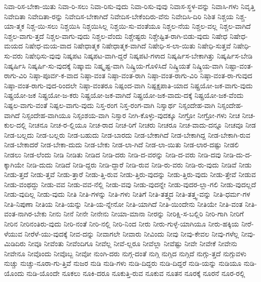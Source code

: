 {ನಿವಾ-ರಿಸ-ಬೇಕಾ-ಯಿತು
ನಿವಾ-ರಿ-ಸಲು
ನಿವಾ-ರಿಸು-ವುದು
ನಿವಾ-ರಿಸು-ವುವು
ನಿವಾಸ-ಸ್ಥಳ-ವನ್ನು
ನಿವಾಸಿ-ಗಳು
ನಿವೃತ್ತಿ
ನಿವೇದಿತಾ
ನಿವೇದಿತಾ-ರನ್ನು
ನಿವೇದಿಸ-ಬೇಕಾಗಿದೆ
ನಿವೇದಿಸ-ಬೇಕೆಂದಿರು-ವೆನು
ನಿವೇದಿಸಿ-ದಿರಿ
ನಿಶಿತ
ನಿಶ್ಚಯ
ನಿಶ್ಚ-ಯಾ-ತ್ಮಕ
ನಿಶ್ಚ-ಯಿ-ಸಲು
ನಿಶ್ಚಯಿಸಿ
ನಿಶ್ಚಯಿಸಿಲ್ಲ
ನಿಶ್ಚಯಿ-ಸು-ವಂತೆಯೂ
ನಿಶ್ಚಲ-ನೆಯ
ನಿಶ್ಚಲ-ವಲ್ಲ
ನಿಶ್ಚಲ-ವಾಗಿದೆ
ನಿಶ್ಚಲ-ವಾಗು-ತ್ತದೆ
ನಿಶ್ಚಲ-ವಾಗು-ವುದು
ನಿಶ್ಚಲ-ವೆಂದು
ನಿಶ್ಚೇಷ್ಟರು
ನಿಶ್ಚೇಷ್ಟಿತ-ರಾಗಿ-ಬಿಡು-ವುದು
ನಿಷೇಧ
ನಿಷೇಧ-ಮಯದ
ನಿಷೇಧ-ಮಯ-ವಾದ
ನಿಷೇಧಾತ್ಮಕ
ನಿಷೇಧಾತ್ಮಕ-ವಾಗಿದೆ
ನಿಷೇಧಿ-ಸ-ಲಾ-ಯಿತು
ನಿಷೇಧಿ-ಸುತ್ತವೆ
ನಿಷೇಧಿ-ಸು-ವರು
ನಿಷೇಧಿಸು-ವುವು
ನಿಷ್ಕಪಟ
ನಿಷ್ಕಪಟ-ವಾಗಿ-ದ್ದರೆ
ನಿಷ್ಕಪಟಿ-ಗಳಾದ
ನಿಷ್ಕರ್ಷಿಸ-ಬೇಕಾಗಿತ್ತು
ನಿಷ್ಕರ್ಷಿಸ-ಬೇಡಿ
ನಿಷ್ಕರ್ಷಿಸಿ
ನಿಷ್ಕರ್ಷಿ-ಸು-ವುದಕ್ಕೆ
ನಿಷ್ಕಾಮ
ನಿಷ್ಕೃಷ್ಟ-ವಾಗಿ
ನಿಷ್ಕ್ರಿಯ-ಗೊಳಿಸಿದೆ
ನಿಷ್ಕ್ರಿಯತೆ
ನಿಷ್ಕ್ರಿಯ-ವಾಗಿ
ನಿಷ್ಟಾ-ವಂತ-ರಾಗು-ವಿರಿ
ನಿಷ್ಠಾ-ಪೂರ್ವ-ಕ-ವಾದ
ನಿಷ್ಠಾ-ವಂತ
ನಿಷ್ಠಾ-ವಂತ-ರಾಗಿ
ನಿಷ್ಠಾ-ವಂತ-ರಾಗು-ವಿರಿ
ನಿಷ್ಠಾ-ವಂತ-ರಾ-ಗುವುದ
ನಿಷ್ಠಾ-ವಂತ-ರಾಗು-ವುದ-ರಿಂದಲೇ
ನಿಷ್ಠಾ-ವಂತರೂ
ನಿಷ್ಪಂದ-ವಾಗಿ
ನಿಷ್ಪಕ್ಷಪಾತಿ-ಯಾದ
ನಿಷ್ಪ್ರಯೋ-ಜಕ-ವಾಗು-ವುದು
ನಿಷ್ಪ್ರಯೋ-ಜಕ
ನಿಷ್ಪ್ರಯೋ-ಜ-ಕರು
ನಿಷ್ಪ್ರಯೋ-ಜಕ-ವಾಗಿದೆ
ನಿಷ್ಪ್ರಯೋ-ಜಕ-ವಾದು-ದಕ್ಕೆ
ನಿಷ್ಪ್ರಯೋ-ಜಕ-ವೆಂದು
ನಿಷ್ಫಲ-ವಾಗು-ವಂತೆ
ನಿಷ್ಫಲ-ವಾಗು-ವುದು
ನಿಸ್ತ-ರಂಗ
ನಿಸ್ತ-ರಂಗ-ವಾಗಿ
ನಿಸ್ವಾರ್ಥ
ನಿಸ್ಸಂದೇಹ-ವಾಗಿ
ನಿಸ್ಸಂದೇಹ-ವಾಗಿದೆ
ನಿಸ್ಸಂದೇಹ-ವಾಗಿಯೂ
ನಿಸ್ಸಂಶಯ-ವಾಗಿ
ನಿಸ್ಸಾರ
ನೀಗಿ-ಕೊಳ್ಳು-ವುದಕ್ಕೂ
ನೀಗ್ರೋ
ನೀಗ್ರೋ-ಗಳು
ನೀಚ
ನೀಚ-ಕುಲ-ದಲ್ಲಿ
ನೀಚನೂ
ನೀಚ-ರ-ಲ್ಲಿಯೂ
ನೀಚ-ರಾದ
ನೀಚ-ರಿಗೆ
ನೀಚರು
ನೀಚರೂ
ನೀಚ-ವಾದು-ದನ್ನೂ
ನೀಚವೂ
ನೀಡ
ನೀಡ-ಬಲ್ಲದು
ನೀಡ-ಬಲ್ಲರು
ನೀಡ-ಬಹುದು
ನೀಡ-ಬಾರದು
ನೀಡ-ಬೇಕಾಗಿದೆ
ನೀಡ-ಬೇಕಾಗಿದ್ದ
ನೀಡ-ಬೇಕಾಗಿ-ರುವ
ನೀಡ-ಬೇಕಾದರೆ
ನೀಡ-ಬೇಕಾ-ದುದು
ನೀಡ-ಬೇಕು
ನೀಡ-ಲಾ-ಗಿದೆ
ನೀಡ-ಲಾ-ಯಿತು
ನೀಡ-ಲಾರ-ದಷ್ಟು
ನೀಡಲಿ
ನೀಡಲು
ನೀಡ-ಲೆಂದು
ನೀಡಿ
ನೀಡಿತು
ನೀಡಿದ
ನೀಡಿ-ದರು
ನೀಡಿ-ದ-ವರನ್ನು
ನೀಡಿ-ದ-ವರು
ನೀಡಿ-ದವು
ನೀಡಿ-ದು-ದ-ಕ್ಕಾಗಿಯೇ
ನೀಡಿ-ದುದು
ನೀಡಿದೆ
ನೀಡಿ-ದ್ದರು
ನೀಡಿ-ದ್ದಾರೆ
ನೀಡಿ-ರುವ
ನೀಡಿ-ರು-ವರು
ನೀಡಿ-ರು-ವುದು
ನೀಡಿವೆ
ನೀಡು
ನೀಡು-ತ್ತದೆ
ನೀಡು-ತ್ತವೆ
ನೀಡು-ತ್ತಾರೆ
ನೀಡು-ತ್ತಿ-ರುವ
ನೀಡು-ತ್ತಿರು-ವುದನ್ನು
ನೀಡು-ತ್ತಿರು-ವುದು
ನೀಡು-ತ್ತೇವೆ
ನೀಡುವ
ನೀಡು-ವಂಥದ್ದು
ನೀಡು-ವವ
ನೀಡು-ವವ-ನೆಲ್ಲಿ
ನೀಡು-ವವು
ನೀಡು-ವುದನ್ನೇ
ನೀಡು-ವುದರ-ಲ್ಲಾ-ಗಲಿ
ನೀಡು-ವುದಲ್ಲದೆ
ನೀಡು-ವುದಿಲ್ಲ
ನೀಡು-ವುದು
ನೀತಿ
ನೀತಿ-ಗಳನ್ನು
ನೀತಿ-ಗಳು
ನೀತಿಗೆ
ನೀತಿ-ತತ್ತ್ವದ
ನೀತಿ-ತತ್ತ್ವ-ವನ್ನು
ನೀತಿ-ಧರ್ಮ-ಗಳ
ನೀತಿ-ನಿಪುಣಾ
ನೀತಿಯ
ನೀತಿ-ಯನ್ನು
ನೀತಿ-ಯ-ನ್ನೇನೋ
ನೀತಿ-ಯಾಗಿದೆ
ನೀತಿ-ಯಿಂದೇನು
ನೀತಿಯೇ
ನೀತಿ-ವಂತ
ನೀತಿ-ವಂತ-ನಾಗಿರ-ಬೇಕು
ನೀನು
ನೀನೆ
ನೀನೇ
ನೀನೇನು
ನೀಯಾ-ಮಾನಾ
ನೀರನ್ನು
ನೀರಿಕ್ಷಿ-ಸ-ಬಲ್ಲಿರಿ
ನೀರಿ-ಗಾಗಿ
ನೀರಿಗೆ
ನೀರಿನ
ನೀರಿನಂತಿರು-ವುದು
ನೀರಿ-ನಂತೆ
ನೀರಿ-ನಲ್ಲಿ
ನೀರಿ-ನಿಂದ
ನೀರು
ನೀರು-ಗುಳ್ಳೆ-ಯಾಗಿಯೂ
ನೀರು-ಹಕ್ಕಿಯ
ನೀರೆ-ಳೆಯುವ
ನೀರೆಳೆ-ಯು-ವುದಕ್ಕೆ
ನೀವ-ದನ್ನು
ನೀವಾಗಲೇ
ನೀವಾರು
ನೀವಿಂದು
ನೀವು
ನೀವು-ಕೇವಲ
ನೀವು-ಗಳೆಲ್ಲ
ನೀವು-ಮಿಡಿದಿರು
ನೀವೂ
ನೀವೆಂತು
ನೀವೆಂದಿಗೂ
ನೀವೆಲ್ಲ
ನೀವೆ-ಲ್ಲರೂ
ನೀವೆಲ್ಲಾ
ನೀವೆಷ್ಟು
ನೀವೇ
ನೀವೇಕೆ
ನೀವೇನು
ನೀವೇನೂ
ನೀವೊಂದು
ನೀವೊಬ್ಬ
ನೀವೋ
ನುಂಗಿ-ದರು
ನುಗ್ಗ-ದಂತೆ
ನುಗ್ಗಿ
ನುಗ್ಗಿದ
ನುಗ್ಗಿದೆ
ನುಗ್ಗು-ತ್ತದೆ
ನುಗ್ಗುವಳು
ನುಚ್ಚು
ನುಚ್ಚು-ನೂರಾ-ಗು-ತ್ತಿವೆ
ನುಜರ
ನುಡಿ
ನುಡಿ-ಗಳು
ನುಡಿ-ದಿದ್ದರು
ನುಡಿ-ದಿದ್ದರೆ
ನುಡಿ-ಯನ್ನು
ನುಡಿಯೂ
ನುಡಿ-ಯೊಂದು
ನುಡಿ-ಯೊಂದೇ
ನೂಕಲು
ನೂಕಿ-ದರೂ
ನೂಕುತ್ತಿ-ರುವ
ನೂಕುವ
ನೂತನ
ನೂರಕ್ಕೆ
ನೂರನೆ
ನೂರ-ರಲ್ಲಿ
}
